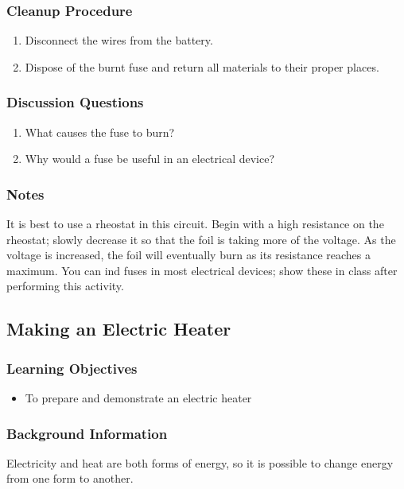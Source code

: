 \subsubsection*{Cleanup Procedure}
\begin{enumerate}
\item{Disconnect the wires from the battery.}
\item{Dispose of the burnt fuse and return all materials to their proper places.}
\end{enumerate}

\subsubsection*{Discussion Questions}
\begin{enumerate}
\item{What causes the fuse to burn?}
\item{Why would a fuse be useful in an electrical device?}
\end{enumerate}

\subsubsection*{Notes}
It is best to use a rheostat in this circuit.  Begin with a high resistance on the rheostat; slowly decrease it so that the foil is taking more of the voltage.  As the voltage is increased, the foil will eventually burn as its resistance reaches a maximum.
You can ind fuses in most electrical devices; show these in class after performing this activity.


\subsection{Making an Electric Heater}

\subsubsection*{Learning Objectives}
\begin{itemize}
\item{To prepare and demonstrate an electric heater} 
\end{itemize}

\subsubsection*{Background Information}
Electricity and heat are both forms of energy, so it is possible to change energy from one form to another.  

